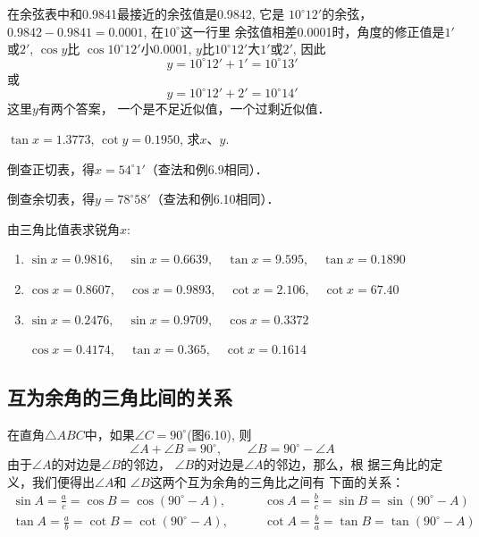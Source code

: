 \begin{solution}
    在余弦表中和0.9841最接近的余弦值是0.9842, 它是
$10^{\circ}12'$的余弦，$0.9842-0.9841=0.0001$, 在$10^{\circ}$这一行里
余弦值相差0.0001时，角度的修正值是$1'$或$2'$, $\cos y$比
$\cos10^{\circ}12'$小0.0001, $y$比$10^{\circ}12'$大$1'$或$2'$, 因此
\[y=10^{\circ}12'+1'=10^{\circ}13'\]
或\[y=10^{\circ}12'+2'=10^{\circ}14'\]
这里$y$有两个答案，
一个是不足近似值，一个过剩近似值．
\end{solution}

\begin{example}
    $\tan x=1.3773$, $\cot y=0.1950$, 求$x$、$y$.
\end{example}

\begin{solution}
倒查正切表，得$x=54^{\circ}1'$（查法和例6.9相同）．

倒查余切表，得$y=78^{\circ}58'$（查法和例6.10相同）．
\end{solution}

\begin{ex}
    由三角比值表求锐角$x$:
\begin{enumerate}
    \item $\sin x=0.9816,\quad
    \sin x=0.6639,\quad
    \tan x=9.595,\quad
    \tan x=0.1890$
    \item $\cos x=0.8607,\quad
    \cos x=0.9893,\quad
    \cot x=2.106,\quad
    \cot x=67.40$
    \item $\sin x=0.2476,\quad
    \sin x=0.9709,\quad
    \cos x=0.3372$
    
    $
    \cos x=0.4174,\quad
    \tan x=0.365,\quad
    \cot x=0.1614$
\end{enumerate}
\end{ex}

\subsection{互为余角的三角比间的关系}
\begin{figure}[htp]
    \centering
{}
    \caption{}
\end{figure}

在直角$\triangle ABC$中，如果$\angle C=90^{\circ}$(图6.10), 则
\[\angle A+\angle B=90^{\circ},\qquad \angle B=90^{\circ}-\angle A\]
由于$\angle A$的对边是$\angle B$的邻边，
$\angle B$的对边是$\angle A$的邻边，那么，根
据三角比的定义，我们便得出$\angle A$和
$\angle B$这两个互为余角的三角比之间有
下面的关系：
\[\begin{split}
    \sin A=\frac{a}{c}=\cos B=\cos(90^{\circ}-A),&\qquad \cos A=\frac{b}{c}=\sin B=\sin(90^{\circ}-A)\\
    \tan A=\frac{a}{b}=\cot B=\cot(90^{\circ}-A),&\qquad \cot A=\frac{b}{a}=\tan B=\tan(90^{\circ}-A)\\
\end{split}\]

